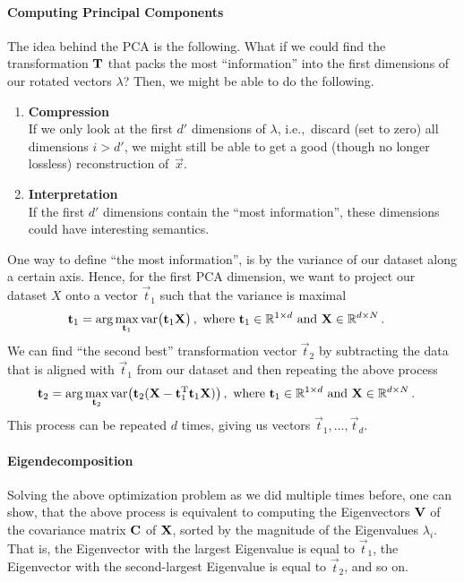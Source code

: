 \documentclass[10pt,letterpaper,oneside]{article}
\begin{document}

\paragraph{Computing Principal Components}
The idea behind the PCA is the following. What if we could find the transformation ${\mathbf{T}}$ that packs the most \enquote{information} into the first dimensions of our rotated vectors $\lambda$? Then, we might be able to do the following.
\begin{enumerate}
	\item \textbf{Compression}\\
	If we only look at the first $d'$ dimensions of $\lambda$, i.e.,~discard (set to zero) all dimensions $i > d'$, we might still be able to get a good (though no longer lossless) reconstruction of~$\vec x$.
	\item \textbf{Interpretation}\\
	If the first $d'$ dimensions contain the \enquote{most information}, these dimensions could have interesting semantics.
\end{enumerate}
One way to define \enquote{the most information}, is by the variance of our dataset along a certain axis. Hence, for the first PCA dimension, we want to project our dataset $X$ onto a vector $\vec t_1$ such that the variance is maximal
\begin{align*}
	{\mathbf{t}}_1 &= \arg\max_{{\mathbf{t}}_1} \mathrm{var}\big({\mathbf{t}}_1 {\mathbf{X}}\big) \,, \text{ where } {\mathbf{t}}_1 \in \mathbb{R}^{1 \times d} \text{ and } {\mathbf{X}} \in \mathbb{R}^{d \times N} \,.
\end{align*}
We can find \enquote{the second best} transformation vector $\vec t_2$ by subtracting the data that is aligned with $\vec t_1$ from our dataset and then repeating the above process
\begin{align*}
	{\mathbf{t}}_2 &= \arg\max_{{\mathbf{t}}_2} \mathrm{var}\big({\mathbf{t}}_2 ( {\mathbf{X}} - {\mathbf{t}}_1^{\mathrm{T}} {\mathbf{t}}_1 {\mathbf{X}}) \big) \,, \text{ where } {\mathbf{t}}_1 \in \mathbb{R}^{1 \times d} \text{ and } {\mathbf{X}} \in \mathbb{R}^{d \times N} \,.
\end{align*}
This process can be repeated $d$ times, giving us vectors $\vec t_1, \ldots, \vec t_d$.

\paragraph{Eigendecomposition}
Solving the above optimization problem as we did multiple times before, one can show, that the above process is equivalent to computing the Eigenvectors ${\mathbf{V}}$ of the covariance matrix ${\mathbf{C}}$ of ${\mathbf{X}}$, sorted by the magnitude of the Eigenvalues $\lambda_i$. That is, the Eigenvector with the largest Eigenvalue is equal to $\vec t_1$, the Eigenvector with the second-largest Eigenvalue is equal to $\vec t_2$, and so on.
\end{document}
